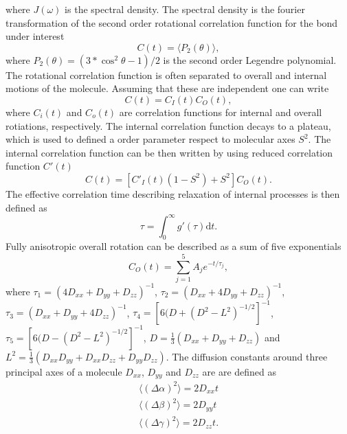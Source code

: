 \documentclass[pre,aps,floatfix,authordate1-4]{revtex4-1}
\begin{document}
where $J(\omega)$ is the spectral density. The spectral density is the
fourier transformation of the second order rotational correlation function
for the bond under interest
\begin{equation}
  C(t)=\langle P_2(\theta) \rangle,
\end{equation}
where $P_2(\theta)=(3*\cos^2\theta-1)/2$ is the second order Legendre polynomial.
The rotational correlation function is often separated to overall and internal
motions of the molecule. Assuming that these are independent one can write
\begin{equation}
  C(t)=C_I(t)C_O(t),
\end{equation}
where $C_i(t)$ and $C_o(t)$ are correlation functions for internal and overall
rotiations, respectively. The internal correlation function decays to a plateau, which
is used to defined a order parameter respect to molecular axes $S^2$.
The internal correlation function can be then written by using
reduced correlation function $C'(t)$
\begin{equation}
  C(t)=[C'_I(t)(1-S^2)+S^2]C_O(t).
\end{equation}
The effective correlation time describing relaxation of internal
processes is then defined as
\begin{equation}
  \tau=\int_0^\infty g'(\tau) \mathrm{d}t.
\end{equation}
Fully anisotropic overall rotation can be described as a sum of five exponentials
\begin{equation}
  C_O(t)=\sum_{j=1}^5 A_j e^{-t/\tau_j},
\end{equation}
where
$\tau_1=(4D_{xx}+D_{yy}+D_{zz})^{-1}$,
$\tau_2=(D_{xx}+4D_{yy}+D_{zz})^{-1}$,
$\tau_3=(D_{xx}+D_{yy}+4D_{zz})^{-1}$,
$\tau_4=[6(D+(D^2-L^2)^{-1/2}]^{-1}$,
$\tau_5=[6(D-(D^2-L^2)^{-1/2}]^{-1}$,
$D=\frac{1}{3}(D_{xx}+D_{yy}+D_{zz})$ and 
$L^2=\frac{1}{3}(D_{xx}D_{yy}+D_{xx}D_{zz}+D_{yy}D_{zz})$.
The diffusion constants around
three principal axes of a molecule
$D_{xx}$, $D_{yy}$ and $D_{zz}$ are 
are defined as 
\begin{equation}
\begin{aligned}
  \langle (\Delta \alpha)^2 \rangle = 2 D_{xx} t \\
  \langle (\Delta \beta)^2 \rangle = 2 D_{yy} t \\
  \langle (\Delta \gamma)^2 \rangle = 2 D_{zz} t. \\
\end{aligned}
\end{equation}
\end{document}
